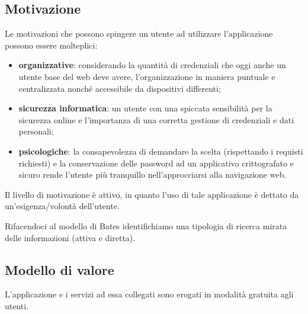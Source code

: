 \documentclass[a4paper]{report}
\begin{document}
\subsection{Motivazione}
Le motivazioni che possono spingere un utente ad utilizzare l’applicazione possono essere molteplici:
\begin{itemize}
\item \textbf{organizzative}: considerando la quantità di credenziali che oggi anche un utente base del web deve avere, l'organizzazione in maniera puntuale e centralizzata nonché accessibile da dispositivi differenti;
\item \textbf{sicurezza informatica}: un utente con una spiccata sensibilità per la sicurezza online e l'importanza di una corretta gestione di credenziali e dati personali;
\item \textbf{psicologiche}: la consapevolezza di demandare la scelta (rispettando i requisti richiesti) e la conservazione delle password ad un applicativo crittografato e sicuro rende l'utente più tranquillo nell'approcciarsi alla navigazione web.
\end{itemize}
Il livello di motivazione è attivo, in quanto l'uso di tale applicazione è dettato da un'esigenza/volontà dell'utente.

Rifacendoci al modello di Bates identifichiamo una tipologia di ricerca mirata delle informazioni (attiva e diretta).

\subsection{Modello di valore}
L’applicazione e i servizi ad essa collegati sono erogati in modalità gratuita agli utenti.
\end{document}
